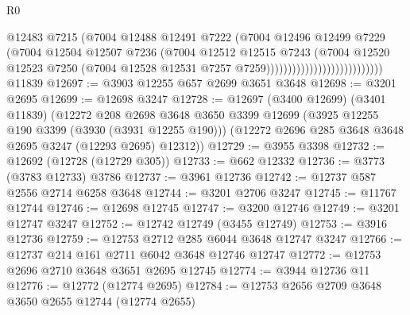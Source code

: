 \begin{lexlean}{R0}
\begin{coremodule}
                                              @12483
                                              @7215
                                              (@7004
                                                @12488
                                                @12491
                                                @7222
                                                (@7004
                                                  @12496
                                                  @12499
                                                  @7229
                                                  (@7004
                                                    @12504
                                                    @12507
                                                    @7236
                                                    (@7004
                                                      @12512
                                                      @12515
                                                      @7243
                                                      (@7004
                                                        @12520
                                                        @12523
                                                        @7250
                                                        (@7004
                                                          @12528
                                                          @12531
                                                          @7257
                                                          @7259)))))))))))))))))))))))))))
    @11839
@12697 := @3903 @12255 @657 @2699 @3651 @3648
@12698 := @3201 @2695
@12699 := @12698 @3247
@12728 := @12697
    (@3400 @12699)
    (@3401 @11839)
    (@12272
      @208
      @2698
      @3648
      @3650
      @3399
      @12699
      (@3925 @12255 @190 @3399 (@3930 (@3931 @12255 @190)))
      (@12272 @2696 @285 @3648 @3648 @2695 @3247 (@12293 @2695) @12312))
@12729 := @3955 @3398
@12732 := @12692 (@12728 (@12729 @305))
@12733 := @662 @12332
@12736 := @3773 (@3783 @12733) @3786
@12737 := @3961 @12736
@12742 := @12737 @587 @2556 @2714 @6258 @3648
@12744 := @3201 @2706 @3247
@12745 := @11767 @12744
@12746 := @12698 @12745
@12747 := @3200 @12746
@12749 := @3201 @12747 @3247
@12752 := @12742 @12749 (@3455 @12749)
@12753 := @3916 @12736
@12759 := @12753 @2712 @285 @6044 @3648 @12747 @3247
@12766 := @12737 @214 @161 @2711 @6042 @3648 @12746 @12747
@12772 := @12753 @2696 @2710 @3648 @3651 @2695 @12745
@12774 := @3944 @12736 @11
@12776 := @12772 (@12774 @2695)
@12784 := @12753 @2656 @2709 @3648 @3650 @2655 @12744 (@12774 @2655)

\end{coremodule}
\end{lexlean}
